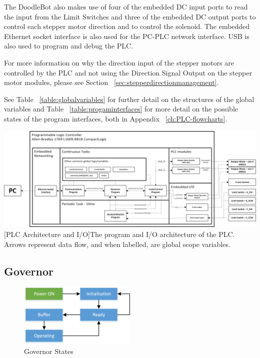 		The DoodleBot also makes use of four of the embedded DC input ports to read the input from the Limit Switches and three of the embedded DC output ports to control each stepper motor direction and to control the solenoid. The embedded Ethernet socket interface is also used for the PC-PLC network interface. USB is also used to program and debug the PLC. 
		
		For more information on why the direction input of the stepper motors are controlled by the PLC and not using the Direction Signal Output on the stepper motor modules, please see Section ~\ref{sec:stepperdirectionmanagement}.
		
				See Table ~\ref{table:globalvariables} for further detail on the structures of the global variables and Table ~\ref{table:progaminterfaces} for more detail on the possible states of the program interfaces, both in Appendix ~\ref{ch:PLC-flowcharts}.
		

\begin{landscape}
		\vspace*{\fill}
		\includegraphics[width=\hsize]{figures/cncMachine/PLC_architecture}
		[PLC Architecture and I/O]{The program and I/O architecture of the PLC. Arrows represent data flow, and when labelled, are global scope variables.}
		\label{fig:PLCarchitecture}
		\vspace*{\fill}
\end{landscape}



	\subsection{Governor}
	
		\begin{figure}[h]
			\centering
			\includegraphics[width=0.5\textwidth]{figures/cncMachine/governor_simple.png}
			\caption{Governor States}
			\label{fig:governor-states}
		\end{figure}
		

